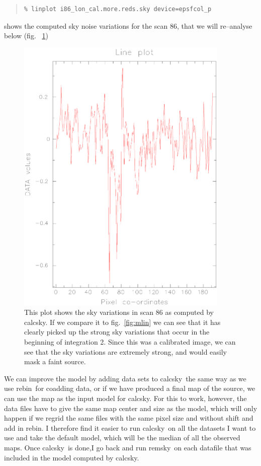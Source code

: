 \documentclass[twoside,11pt]{article}
\newenvironment{myquote}{\begin{quote}\begin{small}}{\end{small}\end{quote}}
\newcommand{\task}[1]{\textsf{#1}}
\newcommand{\rebin}{\xref{\task{rebin}}{sun216}{REBIN}}
\newcommand{\calcsky}{\xref{\task{calcsky}}{sun216}{CALCSKY}}
\newcommand{\remsky}{\xref{\task{remsky}}{sun216}{REMSKY}}
\newcommand{\xref}[3]{#1}
\renewcommand{\_}{\texttt{\symbol{95}}}
\begin{document}
\begin{myquote}
\begin{verbatim}
% linplot i86_lon_cal.more.reds.sky device=epsfcol_p 
\end{verbatim}
\end{myquote}

shows the computed sky noise variations for the scan 86, that we will re--analyse below (fig. \ \ref{fig:sky})


\begin{figure}
\begin{center}
\includegraphics[width=4.0in]{sho_fig4.eps}
\caption{This plot shows the sky variations in scan 86 as computed by \calcsky. If we compare it to fig.\ \ref{fig:mlin} we can see that it has clearly picked up the strong sky variations that occur in the beginning of integration 2. Since this was a calibrated image, we can see that the sky variations are extremely strong, and would easily mask a faint source.}
\label{fig:sky}
\end{center}
\end{figure}



We can improve the model by adding data sets to \calcsky\ the same way
as we use \rebin\ for coadding data, or if we have produced a final map
of the source, we can use the map as the input model for \calcsky.
For this to work, however, the data files have to give the
same map center and size as the model, which will only happen if we
regrid the same files with the same pixel size and without shift and
add in \rebin. I therefore find it easier to run \calcsky\ on all
the datasets I want to use and take the default model, which will be
the median of all the observed maps. Once \calcsky\ is done,I go back
and run \remsky\ on each datafile that was included in the model
computed by \calcsky.
\end{document}
